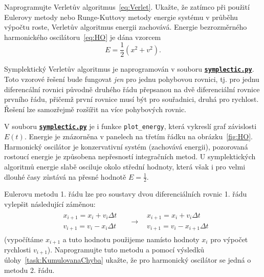\documentclass[a4paper,11pt,twoside]{article}
\def\code#1{\textnormal{\texttt{#1}}}
\def\ghfile#1#2{\textnormal{\textbf{\texttt{\href{https://github.com/PavelStransky/PCInPhysics/blob/main/#1#2}{#2}}}}}
\theoremstyle{red}
\theoremstyle{green}
\begin{document}
\begin{solved}
    Naprogramujte Verletův algoritmus~\eqref{eq:Verlet}.
    Ukažte, že zatímco při použití Eulerovy metody nebo Runge-Kuttovy metody energie systému v průběhu výpočtu roste, Verletův algoritmus energii zachovává.
    Energie bezrozměrného harmonického oscilátoru~\eqref{eq:HO} je dána vzorcem
    \begin{equation}\label{eq:HOE}
        E=\frac{1}{2}\left(x^{2}+v^{2}\right).
    \end{equation}
\end{solved}

\begin{solution}
    Symplektický Verletův algoritmus je naprogramován v souboru \ghfile{python/ode/}{symplectic.py}.
    Toto vzorové řešení bude fungovat \emph{jen} pro jednu pohybovou rovnici, tj. pro jednu diferencální rovnici původně druhého řádu přepsanou na dvě diferenciální rovnice prvního řádu, přičemž první rovnice musí být pro souřadnici, druhá pro rychlost. 
    Řešení lze samozřejmě rozšířit na více pohybových rovnic.

    V souboru \ghfile{python/ode/}{symplectic.py} je i funkce \code{plot_energy}, která vykreslí graf závislosti $E(t)$.
    Energie je znázorněna v panelech na třetím řádku na obrázku~\ref{fig:HO}.
    Harmonický oscilátor je konzervativní systém (zachovává energii), pozorovaná rostoucí energie je způsobena nepřesností integračních metod.
    U symplektických algoritmů energie slabě osciluje okolo střední hodnoty, která však i pro velmi dlouhé časy zůstává na přesné hodnotě $E=\frac{1}{2}$.
\end{solution}


\begin{solved}
    Eulerovu metodu 1. řádu lze pro soustavy dvou diferenciálních rovnic 1. řádu vylepšit následující záměnou:
    \begin{align}
        &\begin{matrix}
            x_{i+1}=x_{i}+v_{i}\Delta t \\
            v_{i+1}=v_{i}-x_{i}\Delta t 
        \end{matrix}
        &&\longrightarrow
        &\begin{matrix}
            x_{i+1}=x_{i}+v_{i}\Delta t \\
            v_{i+1}=v_{i}-x_{i+1}\Delta t 
        \end{matrix}
    \end{align}
    (vypočítáme $x_{i+1}$ a tuto hodnotu použijeme namísto hodnoty $x_{i}$ pro výpočet rychlosti $v_{i+1}$).
    Naprogramujte tuto metodu a pomocí výsledků úlohy~\ref{task:KumulovanaChyba} ukažte, že pro harmonický oscilátor se jedná o metodu 2. řádu.
\end{solved}
\end{document}

